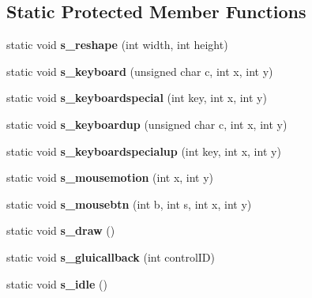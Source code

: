 \subsection*{Static Protected Member Functions}
\begin{DoxyCompactItemize}
\item 
\hypertarget{classBaseGfxApp_a5fe6a77d37044cbe28647ed3391bbb7a}{static void {\bfseries s\-\_\-reshape} (int width, int height)}\label{classBaseGfxApp_a5fe6a77d37044cbe28647ed3391bbb7a}

\item 
\hypertarget{classBaseGfxApp_a52edb2569227319feb68779844e7d857}{static void {\bfseries s\-\_\-keyboard} (unsigned char c, int x, int y)}\label{classBaseGfxApp_a52edb2569227319feb68779844e7d857}

\item 
\hypertarget{classBaseGfxApp_a1e8d90a4faab60300ddf2a4ea9b83115}{static void {\bfseries s\-\_\-keyboardspecial} (int key, int x, int y)}\label{classBaseGfxApp_a1e8d90a4faab60300ddf2a4ea9b83115}

\item 
\hypertarget{classBaseGfxApp_aa1ca205af9d6cee33949f2e6adf4c923}{static void {\bfseries s\-\_\-keyboardup} (unsigned char c, int x, int y)}\label{classBaseGfxApp_aa1ca205af9d6cee33949f2e6adf4c923}

\item 
\hypertarget{classBaseGfxApp_a0e4dfe006f3cc9126c1cc8ad32784f75}{static void {\bfseries s\-\_\-keyboardspecialup} (int key, int x, int y)}\label{classBaseGfxApp_a0e4dfe006f3cc9126c1cc8ad32784f75}

\item 
\hypertarget{classBaseGfxApp_a5e640f2394f7e038d0dd2b469d5c2e24}{static void {\bfseries s\-\_\-mousemotion} (int x, int y)}\label{classBaseGfxApp_a5e640f2394f7e038d0dd2b469d5c2e24}

\item 
\hypertarget{classBaseGfxApp_a22dd953bfb75add9fd0f8f2f8be535c5}{static void {\bfseries s\-\_\-mousebtn} (int b, int s, int x, int y)}\label{classBaseGfxApp_a22dd953bfb75add9fd0f8f2f8be535c5}

\item 
\hypertarget{classBaseGfxApp_a58415c6151a2a80e1fe2eaa9919a4dab}{static void {\bfseries s\-\_\-draw} ()}\label{classBaseGfxApp_a58415c6151a2a80e1fe2eaa9919a4dab}

\item 
\hypertarget{classBaseGfxApp_ad4a963321f1147d68369225ab0c7f32f}{static void {\bfseries s\-\_\-gluicallback} (int control\-I\-D)}\label{classBaseGfxApp_ad4a963321f1147d68369225ab0c7f32f}

\item 
\hypertarget{classBaseGfxApp_a272a9972092bed14572b0cff94415963}{static void {\bfseries s\-\_\-idle} ()}\label{classBaseGfxApp_a272a9972092bed14572b0cff94415963}

\end{DoxyCompactItemize}
